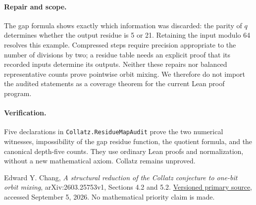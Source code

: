 \documentclass[11pt]{article}
\begin{document}
\paragraph{Repair and scope.}
The gap formula shows exactly which information was discarded: the parity
of $q$ determines whether the output residue is 5 or 21. Retaining the
input modulo 64 resolves this example. Compressed steps require precision
appropriate to the number of divisions by two; a residue table needs an
explicit proof that its recorded inputs determine its outputs.
Neither these repairs nor balanced representative counts prove pointwise
orbit mixing. We therefore do not import the audited statements as a
coverage theorem for the current Lean proof program.

\paragraph{Verification.}
\begingroup\raggedright
Five declarations in \texttt{Collatz.ResidueMapAudit} prove the two numerical
witnesses, impossibility of the gap residue function, the quotient formula,
and the canonical depth-five counts. They use ordinary Lean proofs and
normalization, without a new mathematical axiom. Collatz remains unproved.\par\endgroup

\smallskip\begingroup\raggedright\noindent
[1] Edward Y. Chang, \emph{A structural reduction of the Collatz conjecture
to one-bit orbit mixing}, arXiv:2603.25753v1, Sections 4.2 and 5.2.
\href{https://arxiv.org/html/2603.25753v1}{Versioned primary source},
accessed September 5, 2026. No mathematical priority claim is made.\par\endgroup
\end{document}
